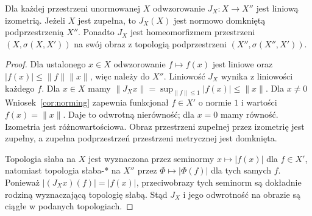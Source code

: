 \begin{stwierdzenie}
\label{prop:canonical26}
Dla każdej przestrzeni unormowanej $X$ odwzorowanie
$J_X:X\to X''$ jest liniową izometrią. Jeżeli $X$ jest zupełna,
to $J_X(X)$ jest normowo domkniętą podprzestrzenią $X''$.
Ponadto $J_X$ jest homeomorfizmem przestrzeni
$(X,\sigma(X,X'))$ na swój obraz z topologią podprzestrzeni
$(X'',\sigma(X'',X'))$.
\end{stwierdzenie}
\begin{proof}
Dla ustalonego $x\in X$ odwzorowanie $f\mapsto f(x)$
jest liniowe oraz $|f(x)|\le\|f\|\|x\|$, więc należy
do $X''$. Liniowość $J_X$ wynika z liniowości każdego $f$.
Dla $x\in X$ mamy
$\|J_Xx\|=\sup_{\|f\|\le1}|f(x)|\le\|x\|$.
Dla $x\ne0$ Wniosek~\ref{cor:norming} zapewnia funkcjonał
$f\in X'$ o normie $1$ i wartości $f(x)=\|x\|$.
Daje to odwrotną nierówność; dla $x=0$ mamy równość.
Izometria jest różnowartościowa. Obraz przestrzeni zupełnej
przez izometrię jest zupełny, a zupełna podprzestrzeń
przestrzeni metrycznej jest domknięta.

Topologia słaba na $X$ jest wyznaczona przez seminormy
$x\mapsto|f(x)|$ dla $f\in X'$, natomiast topologia
słaba-* na $X''$ przez $\Phi\mapsto|\Phi(f)|$ dla
tych samych $f$. Ponieważ $|(J_Xx)(f)|=|f(x)|$,
przeciwobrazy tych seminorm są dokładnie rodziną
wyznaczającą topologię słabą. Stąd $J_X$ i jego
odwrotność na obrazie są ciągłe w podanych topologiach.
\end{proof}

